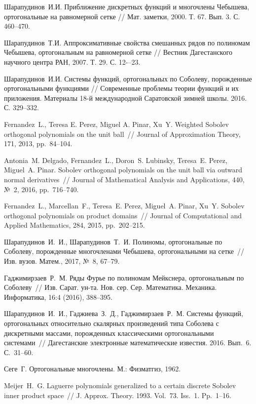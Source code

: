 \begin{thebibliography}{111}
{Шарапудинов~И.И.}
Приближение дискретных функций и многочлены Чебышева, ортогональные на равномерной сетке //
Мат. заметки, 2000. Т. 67. Вып. 3. С. 460--470.


{Шарапудинов~Т.И.}
Аппроксимативные свойства смешанных рядов по полиномам Чебышева, ортогональным на равномерной сетке //
Вестник Дагестанского научного центра РАН, 2007. Т. 29. С. 12-–23.


{Шарапудинов~И.И.}
Системы функций, ортогональных по Соболеву, порожденные ортогональными функциями //
Современные проблемы теории функций и их приложения.  Материалы 18-й международной Саратовской зимней школы. 2016. С. 329--332.


{Fernandez~L., Teresa E. Perez, Miguel A. Pinar, Xu~Y.} Weighted Sobolev orthogonal polynomials on the unit ball~// Journal of Approximation Theory, 171, 2013, pp.~84--104.


{Antonia~M. Delgado, Fernandez~L., Doron~S. Lubinsky, Teresa~E. Perez, Miguel~A. Pinar.} Sobolev orthogonal polynomials on the unit ball via outward normal derivatives~// Journal of Mathematical Analysis and Applications, 440, №~2, 2016, pp.~716--740.


{Fernandez~L., Marcellan~F., Teresa~E. Perez, Miguel~A. Pinar, Xu~Y.} Sobolev orthogonal polynomials on product domains~// Journal of Computational and Applied Mathematics, 284, 2015, pp.~202--215.


{Шарапудинов~И.~И., Шарапудинов~Т.~И.} Полиномы, ортогональные по Соболеву, порожденные многочленами Чебышева, ортогональными на сетке~// Изв. вузов. Матем., 2017, №~8, 67--79.


{Гаджимирзаев~Р.~М.} Ряды Фурье по полиномам Мейкснера, ортогональным по Соболеву~// Изв. Сарат. ун-та. Нов. сер. Сер. Математика. Механика. Информатика, 16:4 (2016), 388--395.


{Шарапудинов~И.~И., Гаджиева~З.~Д., Гаджимирзаев~Р.~М.} Системы функций, ортогональных относительно скалярных произведений типа Соболева с дискретными массами, порожденных классическими ортогональными системами~// Дагестанские электронные математические известия. 2016. Вып.~6. С.~31--60.


{Сеге~Г.} Ортогональные многочлены. М.: Физматгиз, 1962.

Meijer~H.~G. Laguerre polynomials generalized to a certain discrete Sobolev inner product space~// J. Approx. Theory. 1993. Vol.~73. Iss.~1. Pp.~1--16.


\end{thebibliography}
